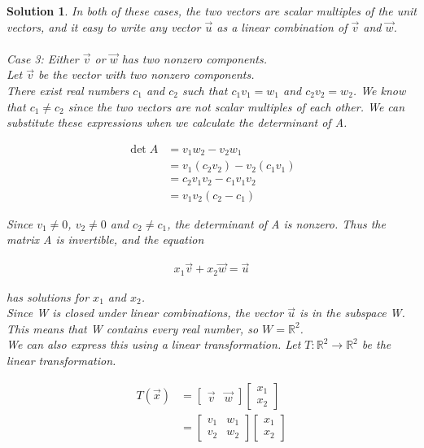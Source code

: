 \documentclass{article}
\newtheorem*{solution}{Solution}
\begin{document}
\begin{solution}
In both of these cases, the two vectors are scalar multiples of the unit vectors, and it easy to write any vector $\vec{u}$ as a linear combination of $\vec{v}$ and $\vec{w}$. \\
\\
\emph{Case 3: } Either $\vec{v}$ or $\vec{w}$ has two nonzero components. \\

Let $\vec{v}$ be the vector with two nonzero components. \\

There exist real numbers $c_{1}$ and $c_{2}$ such that $c_{1} v_{1} = w_{1}$ and $c_{2} v_{2} = w_{2}$. We know that $c_{1} \neq c_{2}$ since the two vectors are not scalar multiples of each other. We can substitute these expressions when we calculate the determinant of A.

\begin{align*}
\det A &= v_{1} w_{2} - v_{2} w_{1} \\
&= v_{1} (c_{2} v_{2}) - v_{2} (c_{1} v_{1}) \\
&= c_{2} v_{1} v_{2} - c_{1} v_{1} v_{2} \\
&= v_{1} v_{2}  (c_{2} - c_{1}) 
\end{align*} 

Since $v_{1} \neq 0$, $v_{2} \neq 0$ and $c_{2} \neq c_{1}$, the determinant of A is nonzero. Thus the matrix A is invertible, and the equation 

\begin{align*}
x_{1} \vec{v} + x_{2} \vec{w} = \vec{u}
\end{align*}

has solutions for $x_{1}$ and $x_{2}$. \\

Since W is closed under linear combinations, the vector $\vec{u}$ is in the subspace W. This means that W contains every real number, so $W = \mathbb{R}^2$. \\

We can also express this using a linear transformation. Let $T : \mathbb{R}^2 \to \mathbb{R}^2$ be the linear transformation.

\begin{align*}
T(\vec{x}) &= \begin{bmatrix} \vec{v} & \vec{w} \end{bmatrix} \begin{bmatrix} x_{1} \\ x_{2} \end{bmatrix} \\
&= \begin{bmatrix} v_{1} & w_{1} \\ v_{2} & w_{2} \end{bmatrix} \begin{bmatrix} x_{1} \\ x_{2} \end{bmatrix}
\end{align*}


\end{solution}
\end{document}
